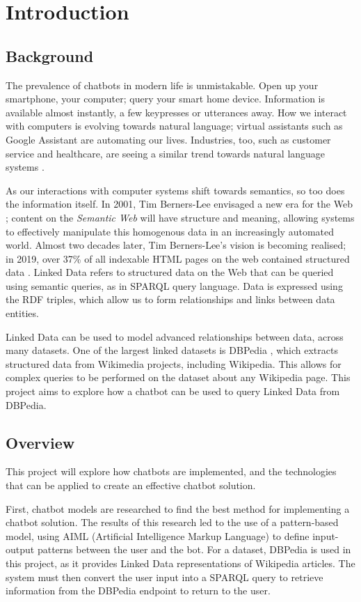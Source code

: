 \chapter{Introduction}
\label{ch:intro}
\section{Background}
The prevalence of chatbots in modern life is unmistakable. Open up your smartphone, your computer; query your smart home device. Information is available almost instantly, a few keypresses or utterances away. How we interact with computers is evolving towards natural language; virtual assistants such as Google Assistant are automating our lives. Industries, too, such as customer service and healthcare, are seeing a similar trend towards natural language systems \cite{gvr2017}.

As our interactions with computer systems shift towards semantics, so too does the information itself. In 2001, Tim Berners-Lee envisaged a new era for the Web \cite{berners2001semantic}; content on the {\it Semantic Web} will have structure and meaning, allowing systems to effectively manipulate this homogenous data in an increasingly automated world. Almost two decades later, Tim Berners-Lee's vision is becoming realised; in 2019, over 37\% of all indexable HTML pages on the web contained structured data \cite{wdc2019crawl}. Linked Data refers to structured data on the Web that can be queried using semantic queries, as in SPARQL query language. Data is expressed using the RDF triples, which allow us to form relationships and links between data entities.

Linked Data can be used to model advanced relationships between data, across many datasets. One of the largest linked datasets is DBPedia \cite{dbpedia2019about}, which extracts structured data from Wikimedia projects, including Wikipedia. This allows for complex queries to be performed on the dataset about any Wikipedia page. This project aims to explore how a chatbot can be used to query Linked Data from DBPedia. 

\section{Overview}
This project will explore how chatbots are implemented, and the technologies that can be applied to create an effective chatbot solution.

First, chatbot models are researched to find the best method for implementing a chatbot solution. The results of this research led to the use of a pattern-based model, using AIML (Artificial Intelligence Markup Language) to define input-output patterns between the user and the bot. For a dataset, DBPedia \cite{dbpedia2019about} is used in this project, as it provides Linked Data representations of Wikipedia articles. The system must then convert the user input into a SPARQL query to retrieve information from the DBPedia endpoint to return to the user.

